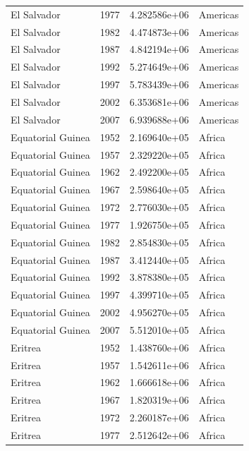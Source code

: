\documentclass[
  letterpaper,
  DIV=11,
  numbers=noendperiod]{scrreprt}
\begin{document}
\begin{tcolorbox}
\begin{tabular}{lrrl}
El Salvador              &  1977 &  4.282586e+06 &  Americas \\
El Salvador              &  1982 &  4.474873e+06 &  Americas \\
El Salvador              &  1987 &  4.842194e+06 &  Americas \\
El Salvador              &  1992 &  5.274649e+06 &  Americas \\
El Salvador              &  1997 &  5.783439e+06 &  Americas \\
El Salvador              &  2002 &  6.353681e+06 &  Americas \\
El Salvador              &  2007 &  6.939688e+06 &  Americas \\
Equatorial Guinea        &  1952 &  2.169640e+05 &    Africa \\
Equatorial Guinea        &  1957 &  2.329220e+05 &    Africa \\
Equatorial Guinea        &  1962 &  2.492200e+05 &    Africa \\
Equatorial Guinea        &  1967 &  2.598640e+05 &    Africa \\
Equatorial Guinea        &  1972 &  2.776030e+05 &    Africa \\
Equatorial Guinea        &  1977 &  1.926750e+05 &    Africa \\
Equatorial Guinea        &  1982 &  2.854830e+05 &    Africa \\
Equatorial Guinea        &  1987 &  3.412440e+05 &    Africa \\
Equatorial Guinea        &  1992 &  3.878380e+05 &    Africa \\
Equatorial Guinea        &  1997 &  4.399710e+05 &    Africa \\
Equatorial Guinea        &  2002 &  4.956270e+05 &    Africa \\
Equatorial Guinea        &  2007 &  5.512010e+05 &    Africa \\
Eritrea                  &  1952 &  1.438760e+06 &    Africa \\
Eritrea                  &  1957 &  1.542611e+06 &    Africa \\
Eritrea                  &  1962 &  1.666618e+06 &    Africa \\
Eritrea                  &  1967 &  1.820319e+06 &    Africa \\
Eritrea                  &  1972 &  2.260187e+06 &    Africa \\
Eritrea                  &  1977 &  2.512642e+06 &    Africa \\

\end{tabular}
\end{tcolorbox}
\end{document}

